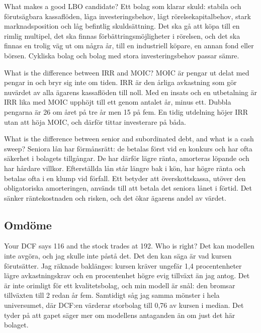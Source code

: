 \begin{fraga}{What makes a good LBO candidate?}
Ett bolag som klarar skuld: stabila och förutsägbara kassaflöden, låga investeringsbehov, lågt
rörelsekapitalbehov, stark marknadsposition och låg befintlig skuldsättning. Det ska gå att
köpa till en rimlig multipel, det ska finnas förbättringsmöjligheter i rörelsen, och det ska
finnas en trolig väg ut om några år, till en industriell köpare, en annan fond eller börsen.
Cykliska bolag och bolag med stora investeringsbehov passar sämre.
\end{fraga}

\begin{fraga}{What is the difference between IRR and MOIC?}
MOIC är pengar ut delat med pengar in och bryr sig inte om tiden. IRR är den årliga avkastning
som gör nuvärdet av alla ägarens kassaflöden till noll. Med en insats och en utbetalning är
IRR lika med MOIC upphöjt till ett genom antalet år, minus ett. Dubbla pengarna är 26\pct{} om
året på tre år men 15\pct{} på fem. En tidig utdelning höjer IRR utan att höja MOIC, och därför
tittar investerare på båda.
\end{fraga}

\begin{fraga}{What is the difference between senior and subordinated debt, and what is a cash sweep?}
Seniora lån har förmånsrätt: de betalas först vid en konkurs och har ofta säkerhet i bolagets
tillgångar. De har därför lägre ränta, amorteras löpande och har hårdare villkor. Efterställda
lån står längre bak i kön, har högre ränta och betalas ofta i en klump vid förfall. Ett
 betyder att överskottskassa, utöver den obligatoriska amorteringen, används
till att betala det seniora lånet i förtid. Det sänker räntekostnaden och risken, och det
ökar ägarens andel av värdet.
\end{fraga}

\subsection{Omdöme}

\begin{fraga}{Your DCF says 116 and the stock trades at 192. Who is right?}
Det kan modellen inte avgöra, och jag skulle inte påstå det. Det den kan säga är vad kursen
förutsätter. Jag räknade baklänges: kursen kräver ungefär 1,4 procentenheter lägre
avkastningskrav och en procentenhet högre evig tillväxt än jag antog. Det är inte orimligt för
ett kvalitetsbolag, och min modell är snål: den bromsar tillväxten till 2\pct{} redan år fem.
Samtidigt såg jag samma mönster i hela universumet, där DCF:en värderar storbolag till 0,76
av kursen i median. Det tyder på att gapet säger mer om modellens antaganden än om just det
här bolaget.
\end{fraga}

